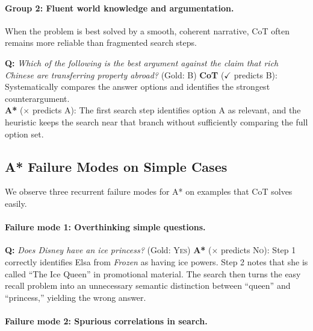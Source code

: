 \documentclass[11pt]{article}
\begin{document}
\paragraph{Group 2: Fluent world knowledge and argumentation.}
When the problem is best solved by a smooth, coherent narrative, CoT often remains more reliable than fragmented search steps.

\begin{examplebox}[title=LogicQA --- Fluent Argumentation]
\textbf{Q:} \emph{Which of the following is the best argument against the claim that rich Chinese are transferring property abroad?} \quad (Gold: B)
\tcblower
\textbf{CoT} ($\checkmark$ predicts B): Systematically compares the answer options and identifies the strongest counterargument.\\[4pt]
\textbf{A*} ($\times$ predicts A): The first search step identifies option A as relevant, and the heuristic keeps the search near that branch without sufficiently comparing the full option set.
\end{examplebox}

\subsection{A* Failure Modes on Simple Cases}
\label{app:astar_failures}

We observe three recurrent failure modes for A* on examples that CoT solves easily.

\paragraph{Failure mode 1: Overthinking simple questions.}

\begin{examplebox}[title=StrategyQA --- Overthinking]
\textbf{Q:} \emph{Does Disney have an ice princess?} \quad (Gold: \textsc{Yes})
\tcblower
\textbf{A*} ($\times$ predicts \textsc{No}): Step 1 correctly identifies Elsa from \emph{Frozen} as having ice powers. Step 2 notes that she is called ``The Ice Queen'' in promotional material. The search then turns the easy recall problem into an unnecessary semantic distinction between ``queen'' and ``princess,'' yielding the wrong answer.
\end{examplebox}

\paragraph{Failure mode 2: Spurious correlations in search.}
\end{document}

